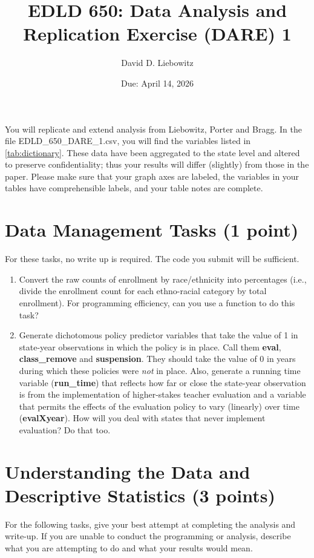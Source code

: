 \documentclass[a4paper, 11pt]{article}
\title{EDLD 650: Data Analysis and Replication Exercise (DARE) 1}
\author{David D. Liebowitz}
\date{Due: April 14, 2026}
\begin{document}
\maketitle

You will replicate and extend analysis from Liebowitz, Porter and Bragg. In the file EDLD\_650\_DARE\_1.csv, you will find the variables listed in \autoref{tab:dictionary}. These data have been aggregated to the state level and altered to preserve confidentiality; thus your results will differ (slightly) from those in the paper. Please make sure that your graph axes are labeled, the variables in your tables have comprehensible labels, and your table notes are complete.



\section{Data Management Tasks (1 point)}
For these tasks, no write up is required. The code you submit will be sufficient.

\begin{enumerate}
	\item[A1.] Convert the raw counts of enrollment by race/ethnicity into percentages (i.e., divide the enrollment count for each ethno-racial category by total enrollment). For programming efficiency, can you use a function to do this task?
	\item[A2.] Generate dichotomous policy predictor variables that take the value of 1 in state-year observations in which the policy is in place. Call them \textbf{eval}, \textbf{class\_remove} and \textbf{suspension}. They should take the value of 0 in years during which these policies were \textit{not} in place. Also, generate a running time variable (\textbf{run\_time}) that reflects how far or close the state-year observation is from the implementation of higher-stakes teacher evaluation and a variable that permits the effects of the evaluation policy to vary (linearly) over time (\textbf{evalXyear}). How will you deal with states that never implement evaluation? Do that too.
\end{enumerate}

\section{Understanding the Data and Descriptive Statistics (3 points)}
For the following tasks, give your best attempt at completing the analysis and write-up. If you are unable to conduct the programming or analysis, describe what you are attempting to do and what your results would mean.
\end{document}
